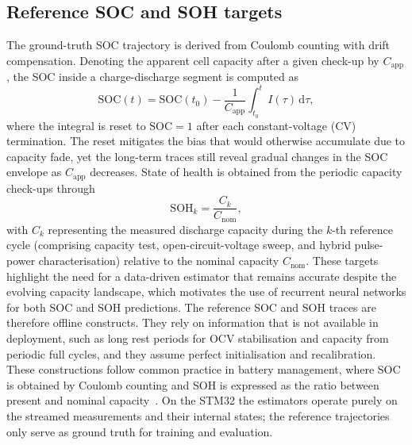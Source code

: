 \documentclass[final,3p,times]{elsarticle}
\begin{document}
\subsection{Reference SOC and SOH targets}
The ground-truth SOC trajectory is derived from Coulomb counting with drift compensation. Denoting the apparent cell capacity after a given check-up by $C_{\mathrm{app}}$, the SOC inside a charge-discharge segment is computed as
\begin{equation}
    \mathrm{SOC}(t) = \mathrm{SOC}(t_0) - \frac{1}{C_{\mathrm{app}}}\int_{t_0}^{t} I(\tau)\,\mathrm{d}\tau,
\end{equation}
where the integral is reset to $\mathrm{SOC}=1$ after each constant-voltage (CV) termination. The reset mitigates the bias that would otherwise accumulate due to capacity fade, yet the long-term traces still reveal gradual changes in the SOC envelope as $C_{\mathrm{app}}$ decreases.
State of health is obtained from the periodic capacity check-ups through
\begin{equation}
    \mathrm{SOH}_k = \frac{C_k}{C_{\mathrm{nom}}},
\end{equation}
with $C_k$ representing the measured discharge capacity during the $k$-th reference cycle (comprising capacity test, open-circuit-voltage sweep, and hybrid pulse-power characterisation) relative to the nominal capacity $C_{\mathrm{nom}}$. These targets highlight the need for a data-driven estimator that remains accurate despite the evolving capacity landscape, which motivates the use of recurrent neural networks for both SOC and SOH predictions.
The reference SOC and SOH traces are therefore offline constructs. They rely on information that is not available in deployment, such as long rest periods for OCV stabilisation and capacity from periodic full cycles, and they assume perfect initialisation and recalibration. These constructions follow common practice in battery management, where SOC is obtained by Coulomb counting and SOH is expressed as the ratio between present and nominal capacity~\cite{plettBatteryManagementSystems2015,a.m.s.m.h.s.attanayakaEstimationStateCharge2019,berecibarCriticalReviewState2016}. On the STM32 the estimators operate purely on the streamed measurements and their internal states; the reference trajectories only serve as ground truth for training and evaluation.
\end{document}
